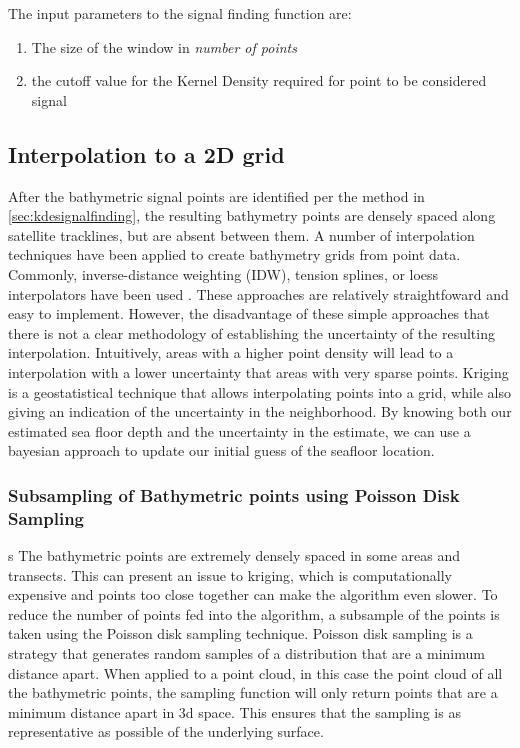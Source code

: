 The input parameters to the signal finding function are:

\begin{enumerate}
    \item The size of the window in \emph{number of points}
    \item the cutoff value for the Kernel Density required for point to be considered signal
\end{enumerate}

\subsection{Interpolation to a 2D grid}

After the bathymetric signal points are identified per the method in \ref{sec:kdesignalfinding}, the resulting bathymetry points are densely spaced along satellite tracklines, but are absent between them. A number of interpolation techniques have been applied to create bathymetry grids from point data. Commonly, inverse-distance weighting (IDW), tension splines, or loess interpolators have been used \parencite{gebcocookbook,Ferreira2017}. These approaches are relatively straightfoward and easy to implement. However, the disadvantage of these simple approaches that there is not a clear methodology of establishing the uncertainty of the resulting interpolation. Intuitively, areas with a higher point density will lead to a interpolation with a lower uncertainty that areas with very sparse points. Kriging is a geostatistical technique that allows interpolating points into a grid, while also giving an indication of the uncertainty in the neighborhood. By knowing both our estimated sea floor depth and the uncertainty in the estimate, we can use a bayesian approach to update our initial guess of the seafloor location.


\subsubsection{Subsampling of Bathymetric points using Poisson Disk Sampling} \label{subsec:poissonsubsampling}
s
The bathymetric points are extremely densely spaced in some areas and transects. This can present an issue to kriging, which is computationally expensive and points too close together can make the algorithm even slower. To reduce the number of points fed into the algorithm, a subsample of the points is taken using the Poisson disk sampling technique. Poisson disk sampling is a strategy that generates random samples of a distribution that are a minimum distance apart. When applied to a point cloud, in this case the point cloud of all the bathymetric points, the sampling function will only return points that are a minimum distance apart in 3d space. This ensures that the sampling is as representative as possible of the underlying surface.

